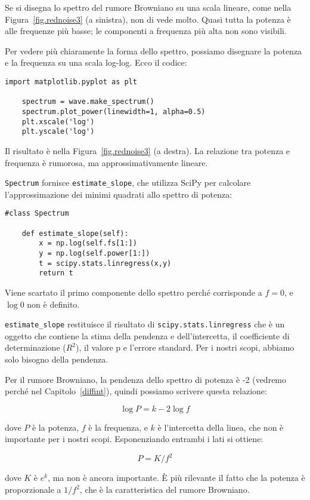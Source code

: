 \documentclass[12pt]{book} \usepackage[width=5.5in,height=8.5in, hmarginratio=3:2,vmarginratio=1:1]{geometry}
\begin{document}
Se si disegna lo spettro del rumore Browniano su una scala lineare, come nella Figura~\ref{fig.rednoise3} (a sinistra), non di vede molto. Quasi tutta la potenza è alle frequenze più basse; le componenti a frequenza più alta non sono visibili.

Per vedere più chiaramente la forma dello spettro, possiamo disegnare la potenza e la frequenza su una scala log-log. Ecco il codice:

\begin{verbatim} 
import matplotlib.pyplot as plt

    spectrum = wave.make_spectrum()
    spectrum.plot_power(linewidth=1, alpha=0.5)
    plt.xscale('log')
    plt.yscale('log')
 \end{verbatim} 

Il risultato è nella Figura~\ref{fig.rednoise3} (a destra). La relazione tra potenza e frequenza è rumorosa, ma approssimativamente lineare.

{\tt Spectrum} fornisce \verb"estimate_slope", che utilizza SciPy per calcolare l'approssimazione dei minimi quadrati allo spettro di potenza:

\begin{verbatim} 
#class Spectrum

    def estimate_slope(self):
        x = np.log(self.fs[1:])
        y = np.log(self.power[1:])
        t = scipy.stats.linregress(x,y)
        return t
 \end{verbatim} 

Viene scartato il primo componente dello spettro perché corrisponde a $f=0$, e $\log 0$ non è definito.

\verb"estimate_slope" restituisce il risultato di {\tt scipy.stats.linregress} che è un oggetto che contiene la stima della pendenza e dell'intercetta, il coefficiente di determinazione ($R^2$), il valore p e l'errore standard. Per i nostri scopi, abbiamo solo bisogno della pendenza.

Per il rumore Browniano, la pendenza dello spettro di potenza è -2 (vedremo perché nel Capitolo~\ref{diffint}), quindi possiamo scrivere questa relazione:

%
\[ \log P = k -2 \log f \] 

%
dove $P$ è la potenza, $f$ è la frequenza, e $k$ è l'intercetta della linea, che non è importante per i nostri scopi. Esponenziando entrambi i lati si ottiene:

%
\[ P = K / f^{2} \] 

%
dove $K$ è $e^k$, ma non è ancora importante. È più rilevante il fatto che la potenza è proporzionale a $1/f^2$, che è la caratteristica del rumore Browniano.
\end{document}
